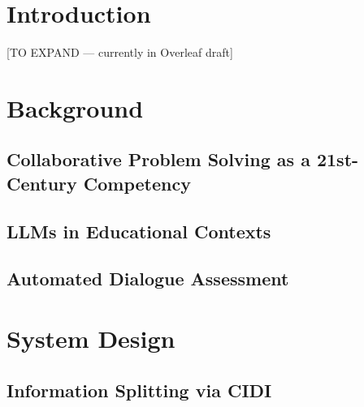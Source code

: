 \documentclass[review,12pt]{elsarticle}
\begin{document}
\linenumbers

\section{Introduction}\label{sec:intro}


[TO EXPAND --- currently in Overleaf draft]

\section{Background}\label{sec:background}

\subsection{Collaborative Problem Solving as a 21st-Century Competency}

\subsection{LLMs in Educational Contexts}

\subsection{Automated Dialogue Assessment}

\section{System Design}\label{sec:system}

\subsection{Information Splitting via CIDI}
\end{document}
